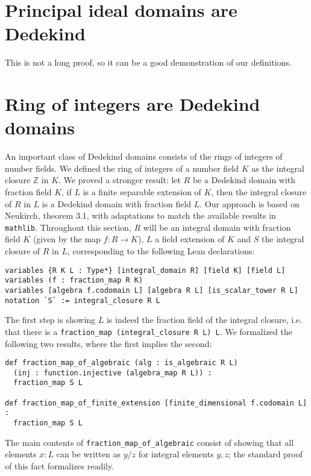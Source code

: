 \documentclass[a4paper,USenglish,cleveref, autoref, thm-restate]{lipics-v2021}
\newcommand{\lean}[1]{\texttt{#1}\xspace} %
\newcommand{\mathlib}{\texttt{mathlib}\xspace}
\newcommand{\Z}{\mathbb{Z}}
\begin{document}
\section{Principal ideal domains are Dedekind}

This is not a long proof, so it can be a good demonstration of our definitions.

\section{Ring of integers are Dedekind domains}

An important class of Dedekind domains consists of the rings of integers of number fields.
We defined the ring of integers of a number field $K$ as the integral closure $\Z$ in $K$.
We proved a stronger result: let $R$ be a Dedekind domain with fraction field $K$, if $L$ is a finite separable extension of $K$, then the integral closure of $R$ in $L$ is a Dedekind domain with fraction field $L$.
Our approach is based on Neukirch, theorem 3.1, with adaptations to match the available results in \mathlib. %
Throughout this section, $R$ will be an integral domain with fraction field $K$ (given by the map $f : R \to K$), $L$ a field extension of $K$ and $S$ the integral closure of $R$ in $L$,
corresponding to the following Lean declarations:
\begin{lstlisting}
variables {R K L : Type*} [integral_domain R] [field K] [field L]
variables (f : fraction_map R K)
variables [algebra f.codomain L] [algebra R L] [is_scalar_tower R L]
notation `S` := integral_closure R L
\end{lstlisting}

The first step is showing $L$ is indeed the fraction field of the integral closure,
i.e. that there is a \lean{fraction\_map (integral\_closure R L) L}.
We formalized the following two results, where the first implies the second:
\begin{lstlisting}
def fraction_map_of_algebraic (alg : is_algebraic R L)
  (inj : function.injective (algebra_map R L)) :
  fraction_map S L

def fraction_map_of_finite_extension [finite_dimensional f.codomain L] :
  fraction_map S L
\end{lstlisting}
The main contents of \lean{fraction\_map\_of\_algebraic} consist of showing that all elements $x : L$ can be written as $y / z$ for integral elements $y, z$;
the standard proof of this fact formalizes readily. %
\end{document}

